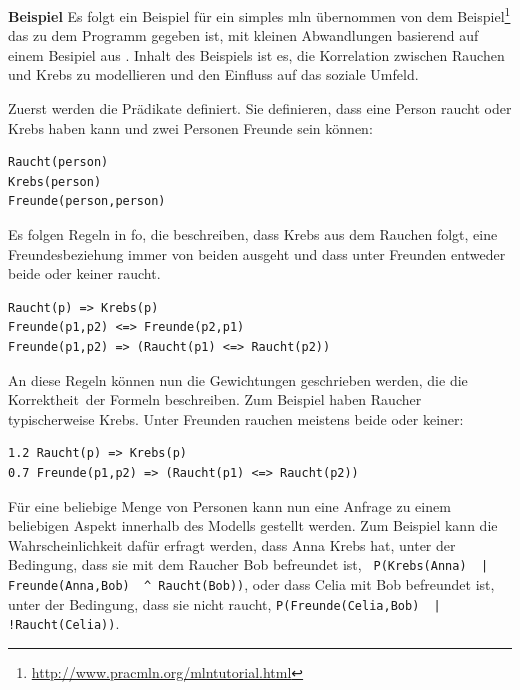 \textbf{Beispiel}\label{mlnexample} Es folgt ein Beispiel für ein simples \gls{mln} übernommen von dem Beispiel\footnote{\url{http://www.pracmln.org/mlntutorial.html}} das zu dem Programm \pracmln gegeben ist, mit kleinen Abwandlungen basierend auf einem Besipiel aus \cite{nyga17}. Inhalt des Beispiels ist es, die Korrelation zwischen Rauchen und Krebs zu modellieren und den Einfluss auf das soziale Umfeld. \par
Zuerst werden die Prädikate definiert. Sie definieren, dass eine Person raucht oder Krebs haben kann und zwei Personen Freunde sein können:
\begin{lstlisting}[backgroundcolor=\color{backcolour}]
Raucht(person)
Krebs(person)
Freunde(person,person)
\end{lstlisting}
Es folgen Regeln in \gls{fo}, die beschreiben, dass Krebs aus dem Rauchen folgt, eine Freundesbeziehung immer von beiden ausgeht und dass unter Freunden entweder beide oder keiner raucht. 
\begin{lstlisting}[backgroundcolor=\color{backcolour}]
Raucht(p) => Krebs(p)
Freunde(p1,p2) <=> Freunde(p2,p1)
Freunde(p1,p2) => (Raucht(p1) <=> Raucht(p2))
\end{lstlisting}
An diese Regeln können nun die Gewichtungen geschrieben werden, die die \glqq Korrektheit\grqq \ der Formeln beschreiben. Zum Beispiel haben Raucher typischerweise Krebs. Unter Freunden rauchen meistens beide oder keiner:
\begin{lstlisting}[backgroundcolor=\color{backcolour}]
1.2 Raucht(p) => Krebs(p)
0.7 Freunde(p1,p2) => (Raucht(p1) <=> Raucht(p2))
\end{lstlisting}  
Für eine beliebige Menge von Personen kann nun eine Anfrage zu einem beliebigen Aspekt innerhalb des Modells  gestellt werden. Zum Beispiel kann die Wahrscheinlichkeit dafür erfragt werden, dass Anna Krebs hat, unter der Bedingung, dass sie mit dem Raucher Bob befreundet ist, \lstinline[breaklines=true]{ P(Krebs(Anna)  | Freunde(Anna,Bob)  ^ Raucht(Bob))}, oder dass Celia mit Bob befreundet ist, unter der Bedingung, dass sie nicht raucht, \lstinline[breaklines=true]{P(Freunde(Celia,Bob)  | !Raucht(Celia))}.


